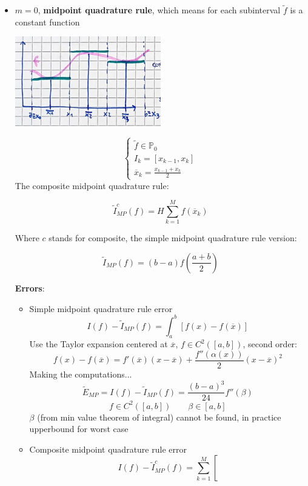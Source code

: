 \begin{itemize}
    \item $m=0$, \textbf{midpoint quadrature rule}, which means for each subinterval $\tilde{f}$ is a constant function
    \begin{center}
        \includegraphics[width=0.5\textwidth]{images/quadrature_m0.png}
    \end{center}
    $$
    \begin{cases}
        \tilde{f}\in\mathbb{P}_0\\
        I_k=[x_{k-1},x_k]\\        
        \overline{x}_k=\frac{x_{k-1}+x_k}{2}
    \end{cases}
    $$
    The composite midpoint quadrature rule:
    \begin{LARGE}
        $$
        \tilde{I}_{MP}^c(f)=H\sum_{k=1}^Mf(\overline{x}_k)
        $$
    \end{LARGE}
    Where $c$ stands for composite, the simple midpoint quadrature rule version:
    \begin{LARGE}
        $$
        \tilde{I}_{MP}(f)=(b-a)f\left(\frac{a+b}{2}\right)
        $$
    \end{LARGE}
    \textbf{Errors}:
    \begin{itemize}
        \item Simple midpoint quadrature rule error
        $$
        I(f)-\tilde{I}_{MP}(f)=\int_a^b\left[f(x)-f(\overline{x})\right]
        $$
        Use the Taylor expansion centered at $\overline{x}$, $f\in C^2([a,b])$, second order:
        $$
        f(x)-f(\overline{x})=f'(\overline{x})(x-\overline{x})+
        \frac{f''(\alpha(x))}{2}(x-\overline{x})^2
        $$
        Making the computations...
        $$
        \tilde{E}_{MP}=I(f)-\tilde{I}_{MP}(f)=
        \frac{(b-a)^3}{24}f''(\beta)
        $$
        $$
        f\in C^2([a,b])\qquad\beta\in[a,b]
        $$
        $\beta$ (from min value theorem of integral) cannot be found, in practice upperbound for worst case
        \item Composite midpoint quadrature rule error
        $$
        I(f)-\tilde{I}_{MP}^c(f)=\sum_{k=1}^M\left[
$$
\end{itemize}
\end{itemize}
